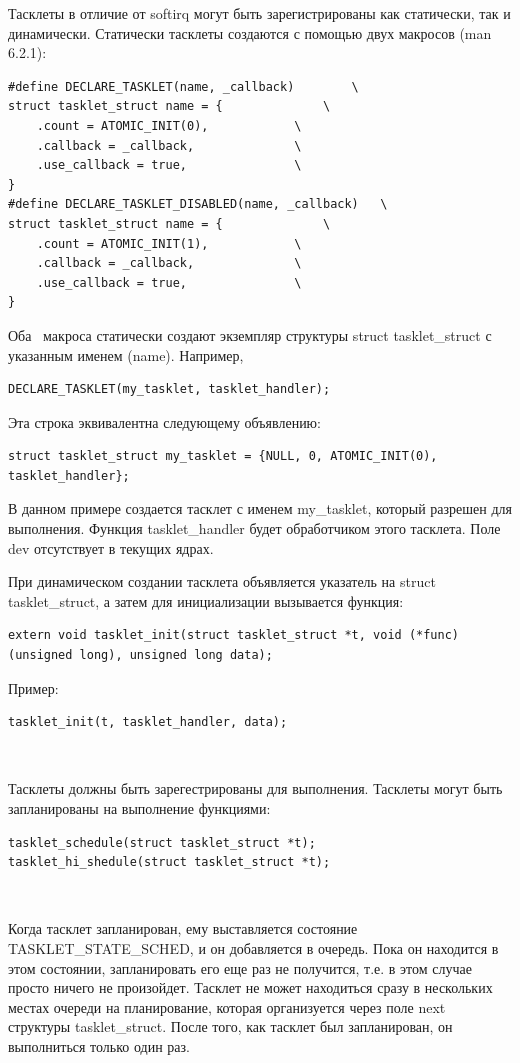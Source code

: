 Тасклеты в отличие от softirq могут быть зарегистрированы как статически, так и динамически. Статически тасклеты создаются с помощью двух макросов (man 6.2.1):

\begin{lstlisting}
#define DECLARE_TASKLET(name, _callback)		\
struct tasklet_struct name = {				\
	.count = ATOMIC_INIT(0),			\
	.callback = _callback,				\
	.use_callback = true,				\
}
#define DECLARE_TASKLET_DISABLED(name, _callback)	\
struct tasklet_struct name = {				\
	.count = ATOMIC_INIT(1),			\
	.callback = _callback,				\
	.use_callback = true,				\
}
\end{lstlisting}

Оба  макроса статически создают экземпляр структуры struct tasklet\_struct с указанным именем (name). Например,

\begin{lstlisting}
DECLARE_TASKLET(my_tasklet, tasklet_handler);
\end{lstlisting}

Эта строка эквивалентна следующему объявлению:
\begin{lstlisting}
struct tasklet_struct my_tasklet = {NULL, 0, ATOMIC_INIT(0), tasklet_handler};
\end{lstlisting}

В данном примере создается тасклет с именем my\_tasklet, который разрешен для выполнения. Функция tasklet\_handler будет обработчиком этого тасклета. Поле dev отсутствует в текущих ядрах.

При динамическом создании тасклета объявляется указатель на
struct \\ tasklet\_struct, а затем для инициализации вызывается функция:
\begin{lstlisting}
extern void tasklet_init(struct tasklet_struct *t, void (*func)(unsigned long), unsigned long data);
\end{lstlisting}

Пример:
\begin{lstlisting}
tasklet_init(t, tasklet_handler, data);
\end{lstlisting}   

Тасклеты должны быть зарегестрированы для выполнения. Тасклеты могут быть запланированы на выполнение функциями:
\begin{lstlisting}
tasklet_schedule(struct tasklet_struct *t); 
tasklet_hi_shedule(struct tasklet_struct *t);
\end{lstlisting}  

Когда тасклет запланирован, ему выставляется состояние \\ TASKLET\_STATE\_SCHED, и он добавляется в очередь. Пока он находится в этом состоянии, запланировать его еще раз не получится, т.е. в этом случае просто ничего не произойдет. Тасклет не может находиться сразу в нескольких местах очереди на планирование, которая организуется через поле next структуры tasklet\_struct. После того, как тасклет был запланирован, он выполниться только один раз.


